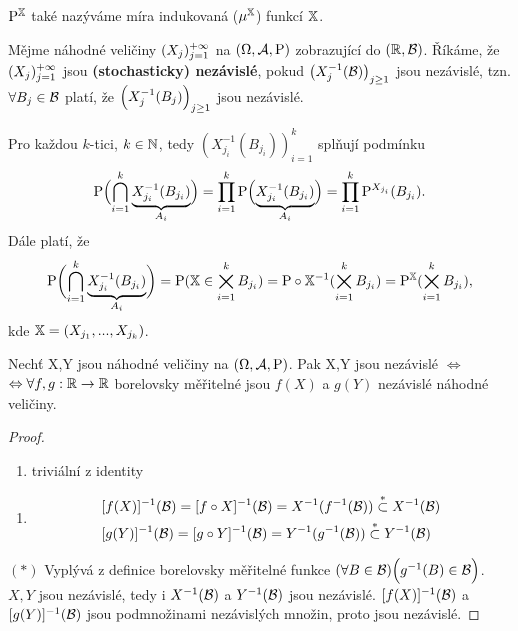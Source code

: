 \begin{remark}
	$\mathrm{P}^{\mathbb{X}}$ také nazýváme míra indukovaná ($\mu^{\mathbb{X}}$) funkcí $\mathbb{X}$.
\end{remark}
\begin{define}
	Mějme náhodné veličiny $(X_j)_{j=1}^{+\infty}$ na $(\Omega,\mathcal{A},\mathrm{P})$ zobrazující do $(\mathbb{R},\mathcal{B})$. Říkáme, že $(X_j)_{j=1}^{+\infty}$ jsou \textbf{(stochasticky) nezávislé}, pokud $\left(X_j^{-1}(\mathcal{B})\right)_{j\geq 1}$ jsou nezávislé, tzn. $\forall B_j \in \mathcal{B}$ platí, že  $\Bigl(X_j^{-1}(B_j)\Bigr)_{j\geq 1}$ jsou nezávislé.
\end{define}
\begin{remark}
		 Pro každou $k$-tici, $k \in \mathbb{N}$, tedy $ \left(X_{j_i}^{-1}(B_{j_i})\right)_{i=1}^k$ splňují podmínku $$\mathrm{P}\Bigl(\bigcap\limits_{i=1}^k \underbrace{X_{j_i}^{-1}(B_{j_i})}_{A_i}\Bigr)=\prod\limits_{i=1}^{k}\mathrm{P}\Bigl(\underbrace{X_{j_i}^{-1}(B_{j_i})}_{A_{i}}\Bigr) = \prod\limits_{i=1}^k \mathrm{P}^{X_{j_i}}(B_{j_i}).$$ Dále platí, že 
	$$ \mathrm{P}\biggl(\bigcap\limits_{i=1}^k \underbrace{X_{j_i}^{-1}(B_{j_i})}_{A_i}\biggr) = \mathrm{P}(\mathbb{X}\in \bigtimes\limits_{i=1}^k B_{j_i})=\mathrm{P} \circ \mathbb{X}^{-1}(\bigtimes\limits_{i=1}^k B_{j_i})=\mathrm{P}^{\mathbb{X}}(\bigtimes\limits_{i=1}^k B_{j_i}),$$ kde $\mathbb{X}=(X_{j_1},...,X_{j_k})$.
\end{remark}
\begin{theorem}
	Nechť X,Y jsou náhodné veličiny na $(\Omega,\mathcal{A},\mathrm{P})$. Pak X,Y jsou nezávislé $\Leftrightarrow $ \newline $\Leftrightarrow \forall f,g:\mathbb{R}\to\mathbb{R}$ borelovsky měřitelné jsou $f(X)$ a $g(Y)$ nezávislé náhodné veličiny.\begin{proof}
		\begin{enumerate}[$\Leftarrow$:]
			\item triviální z identity
		\end{enumerate}
	\begin{enumerate}[$\Rightarrow$:]
	\item \[
	\begin{split}
	 &[f(X)]^{-1}(\mathcal{B})=[f\circ X]^{-1}(\mathcal{B})=X^{-1}(f^{-1}(\mathcal{B})) \stackrel{*}{\subset} X^{-1}(\mathcal{B}) \\
	&[g(Y)]^{-1}(\mathcal{B})=[g\circ Y]^{-1}(\mathcal{B})=Y^{-1}(g^{-1}(\mathcal{B})) \stackrel{*}{\subset} Y^{-1}(\mathcal{B})
	\end{split}
	\]
\end{enumerate}
	$(*)$ Vyplývá z definice borelovsky měřitelné funkce $(\forall B \in \mathcal{B})\Bigl(g^{-1}(B) \in \mathcal{B}\Bigr)$.\newline
	$X,Y$ jsou nezávislé, tedy i $X^{-1}(\mathcal{B})$ a $Y^{-1}(\mathcal{B})$ jsou nezávislé. $ [f(X)]^{-1}(\mathcal{B})$ a $[g(Y)]^{-1}(\mathcal{B})$ jsou podmnožinami nezávislých množin, proto jsou nezávislé.
	\end{proof}
\end{theorem}
